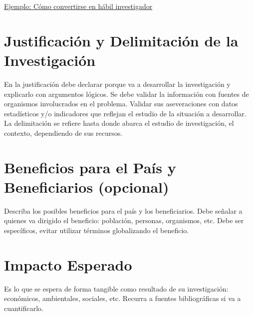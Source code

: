 \documentclass[12pt,a4paper]{article}
\begin{document}
\href{file:///C:/Users/stali/Mi%20unidad/RD%20Docencias/Maestr%C3%ADa%20Humanidades/SEMINARIO%20DE%20INVESTIGACI%C3%93N%20CIENT%C3%8DFICA/SeminarioI_visualcode/Archivosgenerales/comoconvertirseeninvestigador.pdf}{Ejemplo: Cómo convertirse en hábil investigador}


\section{Justificación y Delimitación de la Investigación}
\noindent
En la justificación debe declarar porque va a desarrollar la investigación y explicarlo
con argumentos lógicos. Se debe validar la información con fuentes de organismos
involucrados en el problema. Validar sus aseveraciones con datos estadísticos y/o
indicadores que reflejan el estudio de la situación a desarrollar.
La delimitación se refiere hasta donde abarca el estudio de investigación, el contexto,
dependiendo de sus recursos.

\section{Beneficios para el País y Beneficiarios (opcional)}
\noindent
Describa los posibles beneficios para el país y los beneficiarios. Debe señalar a
quienes va dirigido el beneficio: población, personas, organismos, etc. Debe ser
específicos, evitar utilizar términos globalizando el beneficio.

\section{Impacto Esperado}
\noindent
Es lo que se espera de forma tangible como resultado de su investigación:
económicos, ambientales, sociales, etc. Recurra a fuentes bibliográficas si va a
cuantificarlo.
\end{document}
